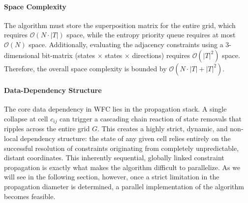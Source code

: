 \paragraph{Space Complexity} The algorithm must store the superposition matrix for the entire grid, which requires $\mathcal{O}(N \cdot |T|)$ space, while the entropy priority queue requires at most $\mathcal{O}(N)$ space. Additionally, evaluating the adjacency constraints using a 3-dimensional bit-matrix (states $\times$ states $\times$ directions) requires $\mathcal{O}(|T|^2)$ space. Therefore, the overall space complexity is bounded by $\mathcal{O}(N \cdot |T| + |T|^2)$.

\paragraph{Data-Dependency Structure}
The core data dependency in WFC lies in the propagation stack. A single collapse at cell $c_{ij}$ can trigger a cascading chain reaction of state removals that ripples across the entire grid $G$. This creates a highly strict, dynamic, and non-local dependency structure: the state of any given cell relies entirely on the successful resolution of constraints originating from completely unpredictable, distant coordinates. This inherently sequential, globally linked constraint propagation is exactly what makes the algorithm difficult to parallelize. As we will see in the following section, however, once a strict limitation in the propagation diameter is determined, a parallel implementation of the algorithm becomes feasible.